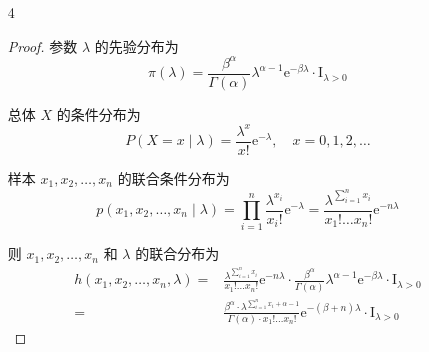 \documentclass[normal,founder,mtpro2,cn]{elegantnote}
\begin{document}
\begin{enumerate}
\begin{proof}
\begin{enumerate}
                      即，
                      \begin{equation*}
                          \theta\mid x_{1},x_{2},\ldots,x_{n}\sim\text{Be}\left(n+1,\sum_{i=1}^{n}x_{i}+1\right)
                      \end{equation*}
                \item
                      在给定样本 $4,3,1,6$ 的条件下，$\theta$ 的后验分布为
                      \begin{equation*}
                          \theta\mid x_{1},x_{2},x_{3},x_{4}\sim\text{Be}\left(5,15\right)
                      \end{equation*}

                      若采用后验期望估计，则 $\theta$ 的贝叶斯估计为
                      \begin{equation*}
                          \hat{\theta}_{B}=\frac{5}{5+15}=0.25
                      \end{equation*}
            \end{enumerate}
        \end{proof}
    \item[4]
        \begin{proof}
            参数 $\lambda$ 的先验分布为
            \begin{equation*}
                \pi(\lambda)=\frac{\beta^{\alpha}}{\Gamma(\alpha)}\lambda^{\alpha-1}\mathrm{e}^{-\beta\lambda}\cdot\mathrm{I}_{\lambda>0}
            \end{equation*}

            总体 $X$ 的条件分布为
            \begin{equation*}
                P(X=x\mid\lambda)=\frac{\lambda^{x}}{x!}\mathrm{e}^{-\lambda},\quad x=0,1,2,\ldots
            \end{equation*}

            样本 $x_{1},x_{2},\ldots,x_{n}$ 的联合条件分布为
            \begin{equation*}
                p\left(x_{1},x_{2},\ldots,x_{n}\mid\lambda\right)=\prod_{i=1}^{n}\frac{\lambda^{x_{i}}}{x_{i}!}\mathrm{e}^{-\lambda}=\frac{\lambda^{\sum_{i=1}^{n}x_{i}}}{x_{1}!\ldots x_{n}!}\mathrm{e}^{-n\lambda}
            \end{equation*}

            则 $x_{1},x_{2},\ldots,x_{n}$ 和 $\lambda$ 的联合分布为
            \begin{equation*}
                \begin{aligned}
                    h\left(x_{1},x_{2},\ldots,x_{n},\lambda\right) = & \frac{\lambda^{\sum_{i=1}^{n}x_{i}}}{x_{1}!\ldots x_{n}!}\mathrm{e}^{-n\lambda}\cdot\frac{\beta^{\alpha}}{\Gamma(\alpha)}\lambda^{\alpha-1}\mathrm{e}^{-\beta\lambda}\cdot\mathrm{I}_{\lambda>0} \\
                    =                                                & \frac{\beta^{\alpha}\cdot\lambda^{\sum_{i=1}^{n}x_{i}+\alpha-1}}{\Gamma(\alpha)\cdot x_{1}!\ldots x_{n}!}\mathrm{e}^{-\left(\beta+n\right)\lambda}\cdot\mathrm{I}_{\lambda>0}
                \end{aligned}
            \end{equation*}


\end{proof}
\end{enumerate}
\end{document}

